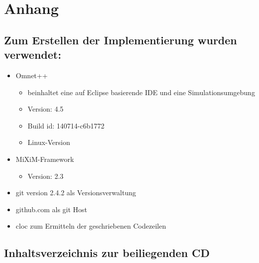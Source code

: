 \cleardoublepage
\appendix
%

\chapter*{Anhang}

\section*{Zum Erstellen der Implementierung wurden verwendet:}

\begin{itemize}
\item Omnet++
\begin{itemize}
\item beinhaltet eine auf Eclipse basierende IDE und eine Simulationsumgebung
\item Version: 4.5
\item Build id: 140714-c6b1772
\item Linux-Version
\end{itemize}
\item MiXiM-Framework
\begin{itemize}
\item Version: 2.3
\end{itemize}
\item git version 2.4.2 als Versionsverwaltung
\item github.com als git Host
\item cloc zum Ermitteln der geschriebenen Codezeilen
\end{itemize}

\section*{Inhaltsverzeichnis zur beiliegenden CD}

